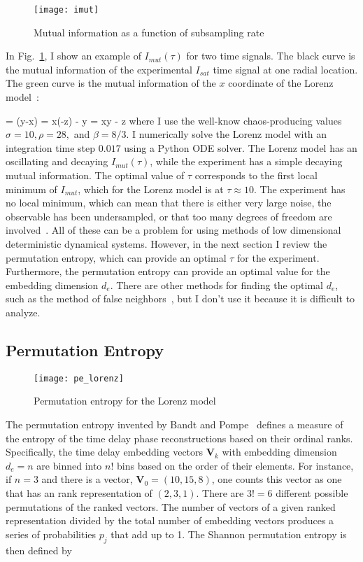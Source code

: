 \begin{figure}[!ht]
\centerline{\texttt{[image: imut]}}
\caption{Mutual information as a function of subsampling rate}
\label{imut}
\end{figure}

In Fig.~\ref{imut}, I show an example of $I_{mut}(\tau)$ for two time signals. The black curve is the mutual information of the experimental $I_{sat}$ time signal at one radial location.
The green curve is the mutual information of the $x$ coordinate of the Lorenz model~\cite{lorenz1963}:

\beq
\label{lorenz_model}
 = \sigma(y-x)   \qquad {} =  x(\rho-z) - y  \qquad {} = xy - \beta z
\eeq
where I use the well-know chaos-producing values $\sigma=10, \rho=28,$ and $\beta = 8/3$. I numerically solve the Lorenz model with an integration time step $0.017$ using a Python ODE solver.
The Lorenz model has an oscillating and decaying $I_{mut}(\tau)$, while the experiment has a simple decaying mutual information. The optimal value of $\tau$ corresponds to the first local minimum
of $I_{mut}$, which for the Lorenz model is at $\tau \approx 10$. The experiment has no local minimum, which can mean that there is either very large noise, the observable has been undersampled,
or that too many degrees of freedom are involved~\cite{manneville2004}. All of these can be a problem for using methods of low dimensional deterministic dynamical systems. However, in the next
section I review the permutation entropy, which can provide an optimal $\tau$ for the experiment. Furthermore, the permutation entropy can provide an optimal value for the embedding dimension
$d_e$. There are other methods for finding the optimal $d_e$, such as the method of false neighbors~\cite{manneville2004}, but I don't use it because it is difficult to analyze.

\subsection{Permutation Entropy}
\label{ss_pe}

\begin{figure}[!ht]
\centerline{\texttt{[image: pe\_lorenz]}}
\caption{Permutation entropy for the Lorenz model}
\label{pe_lorenz}
\end{figure}

The permutation entropy invented by Bandt and Pompe~\cite{bandt2002} defines a measure of the entropy of the time delay phase reconstructions based on their ordinal ranks. Specifically,
the time delay embedding vectors ${\mathbf{V}}_k$ with embedding dimension $d_e = n$ are binned into $n!$ bins based on the order of their elements. For instance, if $n=3$ and there is a vector,
${\mathbf{V}}_0 = (10,15,8)$, one counts this vector as one that has an rank representation of $(2,3,1)$. There are $3!=6$ different possible permutations of the ranked vectors. 
The number of vectors of a given ranked representation divided by the total number of embedding vectors produces a series of probabilities $p_j$ that add up to 1. The Shannon permutation entropy
is then defined by

